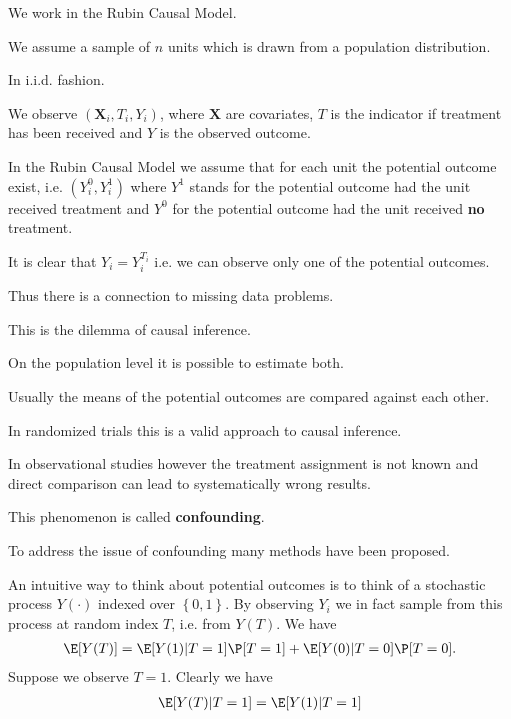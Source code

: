 We work in the Rubin Causal Model.

We assume a sample of $n$ units which is drawn from a population distribution.

In i.i.d. fashion.

We observe $ (\mathbf{X}_i, T_i, Y_i) $,
where $\mathbf{X}$ are covariates, 
$T$ is the indicator if treatment has been received
and $Y$ is the observed outcome.

In the Rubin Causal Model we assume that for each unit the potential outcome exist, i.e. $(Y_i^0, Y_i^1)$ where $Y^1$ stands for the potential outcome had the unit received treatment and $Y^0$ for the potential outcome had the unit received \textbf{no} treatment.

It is clear that $Y_i = Y_i^{T_i}$ i.e. we can observe only one of the potential outcomes.

Thus there is a connection to missing data problems.

This is the dilemma of causal inference.
 
On the population level it is possible to estimate both.

Usually the means of the potential outcomes are compared against each other.

In randomized trials this is a valid approach to causal inference.

In observational studies however the treatment assignment is not known and direct comparison can lead to systematically wrong results.

This phenomenon is called \textbf{confounding}.
 
To address the issue of confounding many methods have been proposed.

An intuitive way to think about potential outcomes is to think of a stochastic process $Y(\cdot)$ indexed over $\left\{ 0,1 \right\}$.
By observing $Y_i$ we in fact sample from this process at random index $T$, i.e. from $Y(T)$.
We have 
\begin{gather}
  \E[Y(T)]
  =
  \E[Y(1) \vert T=1] \P[T=1]
    +
  \E[Y(0) \vert T=0] \P[T=0]
  .
\end{gather}
Suppose we observe $T=1$. Clearly we have
\begin{gather}
  \E[Y(T)\vert T=1]
  =
  \E[Y(1) \vert T=1] 
\end{gather}
